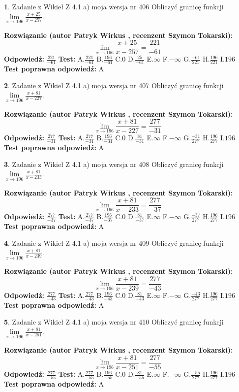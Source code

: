 \documentclass[12pt, a4paper]{article}
\theoremstyle{definition} %
\newtheorem{zad}{}
\newcommand{\zadStart}[1]{\begin{zad}#1\newline}
\newcommand{\zadStop}{\end{zad}}
\newcommand{\rozwStart}[2]{\noindent \textbf{Rozwiązanie (autor #1 , recenzent #2): }\newline}
\newcommand{\rozwStop}{\newline}
\newcommand{\odpStart}{\noindent \textbf{Odpowiedź:}\newline}
\newcommand{\odpStop}{\newline}
\newcommand{\testStart}{\noindent \textbf{Test:}\newline}
\newcommand{\testStop}{\newline}
\newcommand{\kluczStart}{\noindent \textbf{Test poprawna odpowiedź:}\newline}
\newcommand{\kluczStop}{\newline}
\begin{document}
\zadStart{Zadanie z Wikieł Z 4.1 a) moja wersja nr 406}
Obliczyć granicę funkcji $\lim\limits_{x\to196}\frac{x+25}{x-257}$.
\zadStop
\rozwStart{Patryk Wirkus}{Szymon Tokarski}
$$\lim\limits_{x\to196}\frac{x+25}{x-257} = \frac{221}{-61}$$
\rozwStop
\odpStart
$\frac{221}{-61}$
\odpStop
\testStart
A.$\frac{221}{-61}$
B.$\frac{196}{-61}$
C.$0$
D.$\frac{25}{-61}$
E.$\infty$
F.$-\infty$
G.$\frac{-61}{221}$
H.$\frac{196}{221}$
I.$196$
\testStop
\kluczStart
A
\kluczStop



\zadStart{Zadanie z Wikieł Z 4.1 a) moja wersja nr 407}
Obliczyć granicę funkcji $\lim\limits_{x\to196}\frac{x+81}{x-227}$.
\zadStop
\rozwStart{Patryk Wirkus}{Szymon Tokarski}
$$\lim\limits_{x\to196}\frac{x+81}{x-227} = \frac{277}{-31}$$
\rozwStop
\odpStart
$\frac{277}{-31}$
\odpStop
\testStart
A.$\frac{277}{-31}$
B.$\frac{196}{-31}$
C.$0$
D.$\frac{81}{-31}$
E.$\infty$
F.$-\infty$
G.$\frac{-31}{277}$
H.$\frac{196}{277}$
I.$196$
\testStop
\kluczStart
A
\kluczStop



\zadStart{Zadanie z Wikieł Z 4.1 a) moja wersja nr 408}
Obliczyć granicę funkcji $\lim\limits_{x\to196}\frac{x+81}{x-233}$.
\zadStop
\rozwStart{Patryk Wirkus}{Szymon Tokarski}
$$\lim\limits_{x\to196}\frac{x+81}{x-233} = \frac{277}{-37}$$
\rozwStop
\odpStart
$\frac{277}{-37}$
\odpStop
\testStart
A.$\frac{277}{-37}$
B.$\frac{196}{-37}$
C.$0$
D.$\frac{81}{-37}$
E.$\infty$
F.$-\infty$
G.$\frac{-37}{277}$
H.$\frac{196}{277}$
I.$196$
\testStop
\kluczStart
A
\kluczStop



\zadStart{Zadanie z Wikieł Z 4.1 a) moja wersja nr 409}
Obliczyć granicę funkcji $\lim\limits_{x\to196}\frac{x+81}{x-239}$.
\zadStop
\rozwStart{Patryk Wirkus}{Szymon Tokarski}
$$\lim\limits_{x\to196}\frac{x+81}{x-239} = \frac{277}{-43}$$
\rozwStop
\odpStart
$\frac{277}{-43}$
\odpStop
\testStart
A.$\frac{277}{-43}$
B.$\frac{196}{-43}$
C.$0$
D.$\frac{81}{-43}$
E.$\infty$
F.$-\infty$
G.$\frac{-43}{277}$
H.$\frac{196}{277}$
I.$196$
\testStop
\kluczStart
A
\kluczStop



\zadStart{Zadanie z Wikieł Z 4.1 a) moja wersja nr 410}
Obliczyć granicę funkcji $\lim\limits_{x\to196}\frac{x+81}{x-251}$.
\zadStop
\rozwStart{Patryk Wirkus}{Szymon Tokarski}
$$\lim\limits_{x\to196}\frac{x+81}{x-251} = \frac{277}{-55}$$
\rozwStop
\odpStart
$\frac{277}{-55}$
\odpStop
\testStart
A.$\frac{277}{-55}$
B.$\frac{196}{-55}$
C.$0$
D.$\frac{81}{-55}$
E.$\infty$
F.$-\infty$
G.$\frac{-55}{277}$
H.$\frac{196}{277}$
I.$196$
\testStop
\kluczStart
A
\kluczStop
\end{document}
